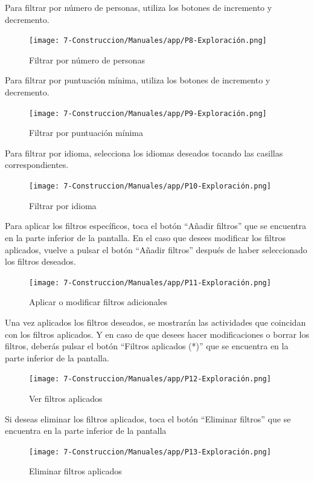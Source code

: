 Para filtrar por número de personas, utiliza los botones de incremento y decremento.
\begin{figure}[H]
	\centering
	\texttt{[image: 7-Construccion/Manuales/app/P8-Exploración.png]}
	\caption{Filtrar por número de personas}
\end{figure}

Para filtrar por puntuación mínima, utiliza los botones de incremento y decremento.
\begin{figure}[H]
	\centering
	\texttt{[image: 7-Construccion/Manuales/app/P9-Exploración.png]}
	\caption{Filtrar por puntuación mínima}
\end{figure}

Para filtrar por idioma, selecciona los idiomas deseados tocando las casillas correspondientes.
\begin{figure}[H]
	\centering
	\texttt{[image: 7-Construccion/Manuales/app/P10-Exploración.png]}
	\caption{Filtrar por idioma}
\end{figure}

Para aplicar los filtros específicos, toca el botón “Añadir filtros” que se encuentra en la parte inferior de la pantalla.
En el caso que desees modificar los filtros aplicados, vuelve a pulsar el botón “Añadir filtros” después de haber seleccionado los filtros deseados.
\begin{figure}[H]
	\centering
	\texttt{[image: 7-Construccion/Manuales/app/P11-Exploración.png]}
	\caption{Aplicar o modificar filtros adicionales}
\end{figure}

Una vez aplicados los filtros deseados, se mostrarán las actividades que coincidan con los filtros aplicados.
Y en caso de que desees hacer modificaciones o borrar los filtros, deberás pulsar el botón “Filtros aplicados (*)” que se encuentra en la parte inferior de la pantalla.
\begin{figure}[H]
	\centering
	\texttt{[image: 7-Construccion/Manuales/app/P12-Exploración.png]}
	\caption{Ver filtros aplicados}
\end{figure}


Si deseas eliminar los filtros aplicados, toca el botón “Eliminar filtros” que se encuentra en la parte inferior de la pantalla
\begin{figure}[H]
	\centering
	\texttt{[image: 7-Construccion/Manuales/app/P13-Exploración.png]}
	\caption{Eliminar filtros aplicados}
\end{figure}

